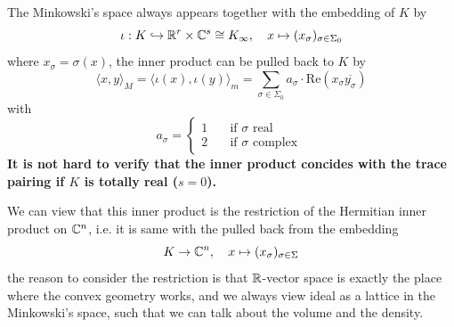     \begin{remark}
        The Minkowski's space always appears together with the embedding of \(K\) by 
        \[\iota : K \hookrightarrow \mathbb{R}^r\times \mathbb{C}^s \cong K_{\infty} , \quad  x \mapsto (x_{\sigma})_{\sigma \in \Sigma_0} \]
        where \(x_{\sigma} = \sigma(x)\), the inner product can be pulled back to \(K\) by 
        \[\langle x,y \rangle_M = \langle \iota(x),\iota(y) \rangle_m = \sum_{\sigma \in \Sigma_0} a_\sigma \cdot \mathrm{Re}(x_\sigma \overline{y_\sigma})\]
        with  \[ a_\sigma = 
        \begin{cases}
           1 \quad &\text{if } \sigma \text{ real }\\
           2 \quad &\text{if } \sigma \text{ complex }
        \end{cases} \]
        \textbf{It is not hard to verify that the inner product concides with the trace pairing if \(K\) is totally real (\(s =0 \)).}

    \end{remark}

    \begin{remark}
        We can view that this inner product is the restriction of the Hermitian inner product on \(\mathbb{C}^n\), i.e. it is same with the pulled back from the embedding
        \[K \to \mathbb{C}^n , \quad x \mapsto (x_{\sigma})_{\sigma \in \Sigma}\]
        the reason to consider the restriction is that \(\mathbb{R}\)-vector space is exactly the place where the convex geometry works, and we always view ideal as a lattice in the Minkowski's space, such that we can talk about the volume and the density. 
    \end{remark}

